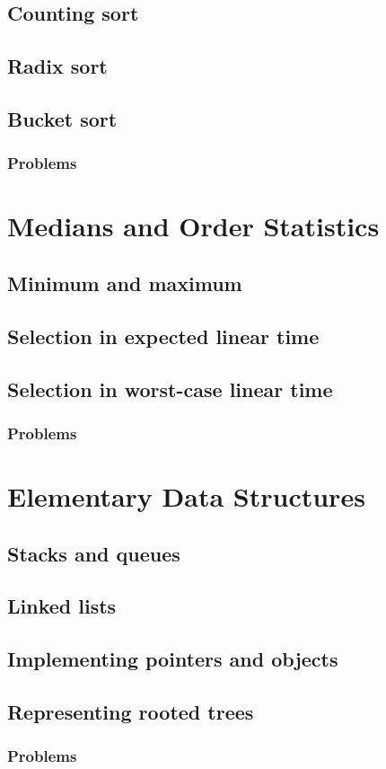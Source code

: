 \documentclass[fontsize=12pt,paper=a4]{book}
\begin{document}
\section{Counting sort}

\section{Radix sort}

\section{Bucket sort}

\subsection*{Problems}


\chapter{Medians and Order Statistics}

\section{Minimum and maximum}

\section{Selection in expected linear time}

\section{Selection in worst-case linear time}

\subsection*{Problems}


\chapter{Elementary Data Structures}

\section{Stacks and queues}

\section{Linked lists}

\section{Implementing pointers and objects}

\section{Representing rooted trees}

\subsection*{Problems}
\end{document}
